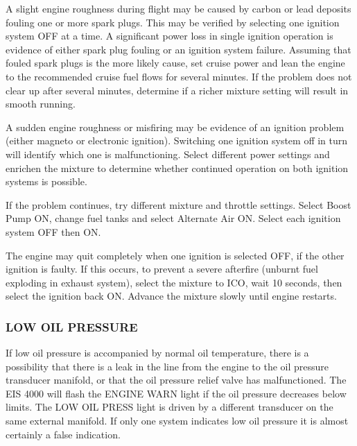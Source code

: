 A slight engine roughness during flight may be caused by carbon or lead deposits fouling one or more spark plugs. 
This may be verified by selecting one ignition system OFF at a time.  A significant power loss in single ignition
operation is evidence of either spark plug fouling or an ignition system failure.  Assuming that fouled spark plugs is
the more likely cause, set cruise power and lean the engine to the recommended cruise fuel flows for several minutes. 
If the problem does not clear up after several minutes, determine if a richer mixture setting will result in smooth
running.

A sudden engine roughness or misfiring may be evidence of an ignition problem (either magneto or electronic ignition).
 Switching one ignition system off in turn will identify which one is malfunctioning.  Select different power settings
and enrichen the mixture to determine whether continued operation on both ignition systems is possible.

If the problem continues, try different mixture and throttle settings. Select Boost Pump ON,
change fuel tanks and select Alternate Air ON. Select each ignition system
OFF then ON.

\begin{Note}[CAUTION]
The engine may quit completely when one ignition is selected OFF, if the other ignition is faulty.  
If this occurs, to prevent a severe afterfire (unburnt fuel exploding in exhaust system), select the mixture to ICO, wait 10 seconds, then select the ignition back ON.
Advance the mixture slowly until engine restarts.
\end{Note}

%

\subsubsection{LOW OIL PRESSURE}

If low oil pressure is accompanied by normal oil temperature, there is a possibility that there is a leak in the line
from the engine to the oil pressure transducer manifold, or that the oil pressure relief valve has malfunctioned.  The
EIS 4000
will flash the ENGINE WARN light if the oil pressure decreases below limits. The LOW OIL PRESS light is driven by a
different transducer on the same external manifold. If only one system indicates low oil pressure it is almost certainly
a false indication.

